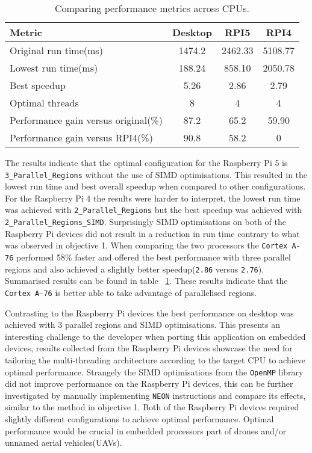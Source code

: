 \begin{table}[htbp]
	\centering
	\begin{tabular}{@{}lccc@{}}
		\toprule
		\textbf{Metric} & \textbf{Desktop} & \textbf{RPI5} & \textbf{RPI4} \\ \midrule
		Original run time(ms)&1474.2&2462.33 &5108.77 \\
		Lowest run time(ms)&188.24 &858.10 &2050.78 \\
		Best speedup&5.26 &2.86 &2.79 \\
		Optimal threads&8 &4 & 4\\
		Performance gain versus original(\%)&87.2&65.2 & 59.90\\
		Performance gain versus RPI4(\%)&90.8 &58.2 &0 \\
		\bottomrule
	\end{tabular}
	\caption{Comparing performance metrics across CPUs.}
	\label{tab:performance_comparison}
\end{table}

The results indicate that the optimal configuration for the Raspberry Pi 5 is \texttt{3\_Parallel\_Regions} without the use of SIMD optimisations. This resulted in the lowest run time and best overall speedup when compared to other configurations. For the Raspberry Pi 4 the results were harder to interpret, the lowest run time was achieved with \texttt{2\_Parallel\_Regions} but the best speedup was achieved with \texttt{2\_Parallel\_Regions\_SIMD}. Surprisingly SIMD optimisations on both of the Raspberry Pi devices did not result in a reduction in run time contrary to what was observed in objective 1. When comparing the two processors the \texttt{Cortex A-76} performed 58\% faster and offered the best performance with three parallel regions and also achieved a slightly better speedup(\texttt{2.86} versus \texttt{2.76}). Summarised results can be found in table ~\ref{tab:performance_comparison}. These results indicate that the \texttt{Cortex A-76} is better able to take advantage of parallelised regions. 

Contrasting to the Raspberry Pi devices the best performance on desktop was achieved with 3 parallel regions and SIMD optimisations. This presents an interesting challenge to the developer when porting this application on embedded devices, results collected from the Raspberry Pi devices showcase the need for tailoring the multi-threading architecture according to the target CPU to achieve optimal performance. Strangely the SIMD optimisations from the \texttt{OpenMP} library did not improve performance on the Raspberry Pi devices, this can be further investigated by manually implementing \texttt{NEON} instructions and compare its effects, similar to the method in objective 1. Both of the Raspberry Pi devices required slightly different configurations to achieve optimal performance. Optimal performance would be crucial in embedded processors part of drones and/or unnamed aerial vehicles(UAVs)\cite{drones_UAV_MLDL}. 

